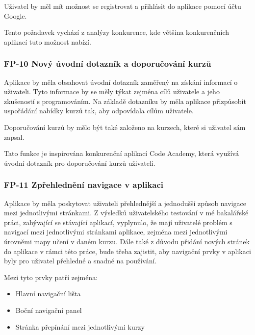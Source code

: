 
Uživatel by měl mít možnost se registrovat a přihlásit do aplikace pomocí účtu Google. 

Tento požadavek vychází z analýzy konkurence, kde většina konkurenčních aplikací tuto možnost nabízí.

\subsubsection{FP-10 Nový úvodní dotazník a doporučování kurzů}

Aplikace by měla obsahovat úvodní dotazník zaměřený na získání informací o uživateli. Tyto informace by se měly týkat zejména cílů uživatele a jeho zkušeností s programováním. Na základě dotazníku by měla aplikace přizpůsobit uspořádání nabídky kurzů tak, aby odpovídala cílům uživatele.

Doporučování kurzů by mělo být také založeno na kurzech, které si uživatel sám zapsal.

Tato funkce je inspirována konkurenční aplikací Code Academy, která využívá úvodní dotazník pro doporučování kurzů uživateli.

\subsubsection{FP-11 Zpřehlednění navigace v aplikaci}

Aplikace by měla poskytovat uživateli přehlednější a jednodušší způsob navigace mezi jednotlivými stránkami. Z výsledků uživatelského testování v mé bakalářské práci, zabývající se stávající aplikací, vyplynulo, že mají uživatelé problém s navigací mezi jednotlivými stránkami aplikace, zejména mezi jednotlivými úrovněmi mapy učení v daném kurzu. Dále také z důvodu přidání nových stránek do aplikace v rámci této práce, bude třeba zajistit, aby navigační prvky v aplikaci byly pro uživatel přehledné a snadné na používání.

Mezi tyto prvky patří zejména:

\begin{itemize}
    \item Hlavní navigační lišta
    \item Boční navigační panel
    \item Stránka přepínání mezi jednotlivými kurzy
\end{itemize}

